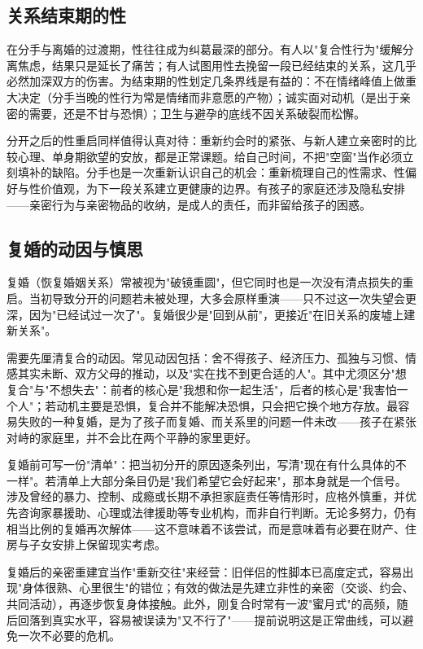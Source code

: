 \subsection{关系结束期的性}

在分手与离婚的过渡期，性往往成为纠葛最深的部分。有人以"复合性行为"缓解分离焦虑，结果只是延长了痛苦；有人试图用性去挽留一段已经结束的关系，这几乎必然加深双方的伤害。为结束期的性划定几条界线是有益的：不在情绪峰值上做重大决定（分手当晚的性行为常是情绪而非意愿的产物）；诚实面对动机（是出于亲密的需要，还是不甘与恐惧）；卫生与避孕的底线不因关系破裂而松懈。

分开之后的性重启同样值得认真对待：重新约会时的紧张、与新人建立亲密时的比较心理、单身期欲望的安放，都是正常课题。给自己时间，不把"空窗"当作必须立刻填补的缺陷。分手也是一次重新认识自己的机会：重新梳理自己的性需求、性偏好与性价值观，为下一段关系建立更健康的边界。有孩子的家庭还涉及隐私安排——亲密行为与亲密物品的收纳，是成人的责任，而非留给孩子的困惑。

\subsection{复婚的动因与慎思}

复婚（恢复婚姻关系）常被视为"破镜重圆"，但它同时也是一次没有清点损失的重启。当初导致分开的问题若未被处理，大多会原样重演——只不过这一次失望会更深，因为"已经试过一次了"。复婚很少是"回到从前"，更接近"在旧关系的废墟上建新关系"。

需要先厘清复合的动因。常见动因包括：舍不得孩子、经济压力、孤独与习惯、情感其实未断、双方父母的推动，以及"实在找不到更合适的人"。其中尤须区分"想复合"与"不想失去"：前者的核心是"我想和你一起生活"，后者的核心是"我害怕一个人"；若动机主要是恐惧，复合并不能解决恐惧，只会把它换个地方存放。最容易失败的一种复婚，是为了孩子而复婚、而关系里的问题一件未改——孩子在紧张对峙的家庭里，并不会比在两个平静的家里更好。

复婚前可写一份"清单"：把当初分开的原因逐条列出，写清"现在有什么具体的不一样"。若清单上大部分条目仍是"我们希望它会好起来"，那本身就是一个信号。涉及曾经的暴力、控制、成瘾或长期不承担家庭责任等情形时，应格外慎重，并优先咨询家暴援助、心理或法律援助等专业机构，而非自行判断。无论多努力，仍有相当比例的复婚再次解体——这不意味着不该尝试，而是意味着有必要在财产、住房与子女安排上保留现实考虑。

复婚后的亲密重建宜当作"重新交往"来经营：旧伴侣的性脚本已高度定式，容易出现"身体很熟、心里很生"的错位；有效的做法是先建立非性的亲密（交谈、约会、共同活动），再逐步恢复身体接触。此外，刚复合时常有一波"蜜月式"的高频，随后回落到真实水平，容易被误读为"又不行了"——提前说明这是正常曲线，可以避免一次不必要的危机。
